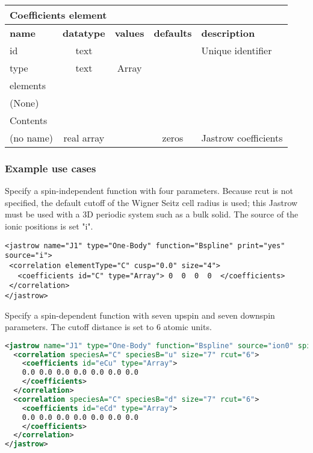 \begin{table}[h]
\begin{center}
\begin{tabular}{l c c c l }
\hline
\multicolumn{5}{l}{Coefficients element} \\
\hline
\bfseries name & \bfseries datatype & \bfseries values & \bfseries defaults & \bfseries description \\
\hline
id & text & & & Unique identifier \\
type & text & Array & & \\
\hline
\multicolumn{5}{l}{elements}\\ \hline
(None) & & & \\ \hline
\multicolumn{5}{l}{Contents}\\ \hline
 (no name) & real array & & zeros & Jastrow coefficients \\ \hline
\end{tabular}
\end{center}
\end{table}


\subsubsection{Example use cases}
\label{sec:1bjsplineexamples}

Specify a spin-independent function with four parameters. Because rcut  is not specified, the default cutoff of the Wigner Seitz cell radius is used; this Jastrow must be used with a 3D periodic system such as a bulk solid. The source of the ionic positions is set "i".
\begin{lstlisting}
<jastrow name="J1" type="One-Body" function="Bspline" print="yes" source="i">
 <correlation elementType="C" cusp="0.0" size="4">
   <coefficients id="C" type="Array"> 0  0  0  0  </coefficients>
 </correlation>
</jastrow>
\end{lstlisting}

Specify a spin-dependent function with seven upspin and seven downspin parameters. The cutoff distance is set to 6 atomic units.
\begin{lstlisting}[language=xml]
<jastrow name="J1" type="One-Body" function="Bspline" source="ion0" spin="yes">
  <correlation speciesA="C" speciesB="u" size="7" rcut="6">
    <coefficients id="eCu" type="Array"> 
    0.0 0.0 0.0 0.0 0.0 0.0 0.0
    </coefficients>
  </correlation>
  <correlation speciesA="C" speciesB="d" size="7" rcut="6">
    <coefficients id="eCd" type="Array"> 
    0.0 0.0 0.0 0.0 0.0 0.0 0.0
    </coefficients>
  </correlation>
</jastrow>
\end{lstlisting}
